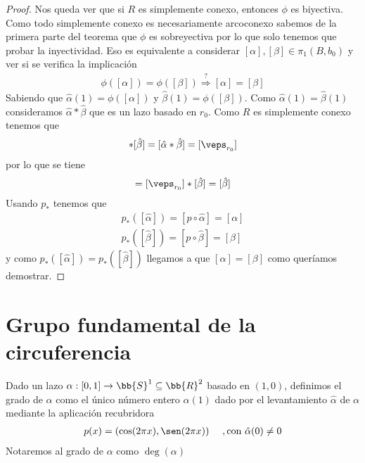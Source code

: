 \begin{teo}
\begin{proof}
        Nos queda ver que si $R$ es simplemente conexo, entonces $\phi$ es biyectiva. Como todo simplemente conexo es necesariamente arcoconexo sabemos de la primera parte del teorema que $\phi$ es sobreyectiva por lo que solo tenemos que probar la inyectividad. Eso es equivalente a considerar $[\alpha],[\beta]\in \pi_1(B,b_0)$ y ver si se verifica la implicación
        \begin{gather*}
             \phi([\alpha]) = \phi([\beta]) \overset{?}{\Rightarrow} [\alpha]=[\beta]
        \end{gather*}
        Sabiendo que $\hat{\alpha}(1) = \phi([\alpha])$ y $\hat{\beta}(1) = \phi([\beta])$. Como $\hat{\alpha}(1)=\hat{\beta}(1)$ consideramos $\hat{\alpha} \ast \hat{\beta}$ que es un lazo basado en $r_0$. Como $R$ es simplemente conexo tenemos que
        \begin{gather*}
            [\hat{\alpha}] \ast [\hat{\beta}] = [\hat{\alpha} \ast \hat{\beta}] = [\veps_{r_0}]
        \end{gather*}
        por lo que se tiene 
        \begin{gather*}
            [\hat{\alpha}] = [\veps_{r_0}] \ast [\hat{\beta}] = [\hat{\beta}]
        \end{gather*}
        Usando $p_*$ tenemos que
        \begin{gather*}
            p_*([\hat{\alpha}]) = [p\circ \hat{\alpha}] = [\alpha]\\
            p_*([\hat{\beta}]) = [p\circ \hat{\beta}] = [\beta]
        \end{gather*}
        y como $p_*([\hat{\alpha}]) = p_*([\hat{\beta}])$ llegamos a que $[\alpha] = [\beta]$ como queríamos demostrar.
    \end{proof}
\end{teo}

\section{Grupo fundamental de la circuferencia}

\begin{definicion}
    Dado un lazo $\alpha:[0,1]\to \bb{S}^1 \subseteq \bb{R}^2$ basado en $(1,0)$, definimos el grado de $\alpha$ como el único número entero $\hat{\alpha}(1)$ dado por el levantamiento $\hat{\alpha}$ de $\alpha$ mediante la aplicación recubridora
    \begin{gather*}
        p(x) = (\cos(2\pi x), \sen(2\pi x))\ \ \ \ , \text{con }\hat{\alpha}(0) \neq 0
    \end{gather*}
    Notaremos al grado de $\alpha$ como $\deg(\alpha)$
\end{definicion}

